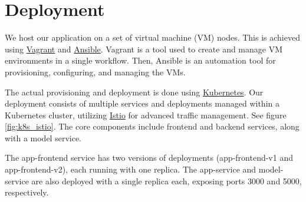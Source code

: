 


\section{Deployment}
We host our application on a set of virtual machine (VM) nodes. This is achieved using {\color{blue} \href{https://www.vagrantup.com/}{Vagrant}} and {\color{blue} \href{https://www.ansible.com/}{Ansible}}. Vagrant is a tool used to create and manage VM environments in a single workflow. Then, Ansible is an automation tool for provisioning, configuring, and managing the VMs.

The actual provisioning and deployment is done using {{\color{blue} \href{https://kubernetes.io/}{Kubernetes}}}.
Our deployment consists of multiple services and deployments managed within a Kubernetes cluster, utilizing {\color{blue} \href{https://istio.io/}{Istio}} for advanced traffic management. See figure {\color{red} \ref{fig:k8s_istio}}. The core components include frontend and backend services, along with a model service.

The app-frontend service has two versions of deployments (app-frontend-v1 and app-frontend-v2), each running with one replica. The app-service and model-service are also deployed with a single replica each, exposing ports 3000 and 5000, respectively.


